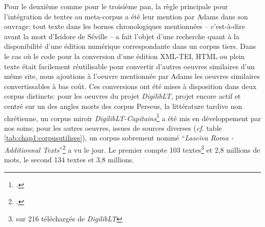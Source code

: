 Pour le deuxième comme pour le troisième pan, la règle principale pour l'intégration de textes au meta-corpus a été leur mention par Adams dans son ouvrage: tout texte dans les bornes chronologiques mentionnées -- c'est-à-dire avant la mort d'Isidore de Séville -- a fait l'objet d'une recherche quant à la disponibilité d'une édition numérique correspondante dans un corpus tiers. Dans le cas où le code pour la conversion d'une édition XML-TEI, HTML ou plein texte était facilement réutilisable pour convertir d'autres oeuvres similaires d'un même site, nous ajoutions à l'oeuvre mentionnée par Adams les oeuvres similaires convertissables à bas coût. Ces conversions ont été mises à disposition dans deux corpus distincts: pour les oeuvres du projet \textit{DigilibLT}, projet encore actif et centré sur un des angles morts des corpus Perseus, la littérature tardive non chrétienne, un corpus miroir \textit{DigilibLT-Capitains}\footcite{Clerice_Digital_Latin_Library_2021} a été mis en développement par nos soins; pour les autres oeuvres, issues de sources diverses (\textit{cf.} table \ref{tab:chap1:corpusutilises}), un corpus sobrement nommé \enquote{\textit{Lasciva Roma - Additionnal Texts}}\footcite{Clerice_Corpora_of_rare_2021} a vu le jour. Le premier compte 103 textes\footnote{sur 216 téléchargés de \textit{DigilibLT}} et 2,8 millions de mots, le second 134 textes et 3,8 millions.


